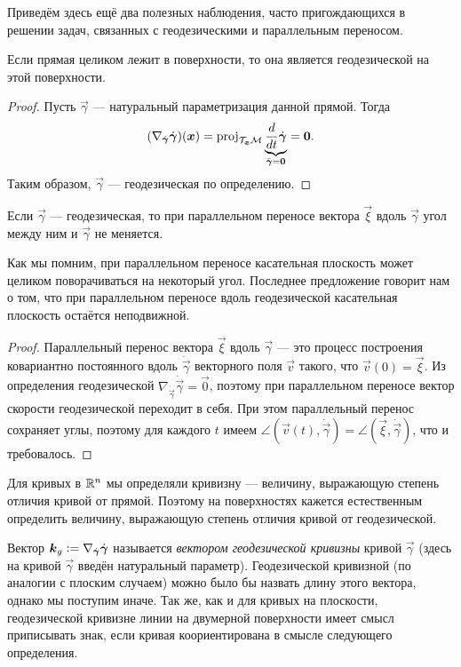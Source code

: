 Приведём здесь ещё два полезных наблюдения, часто пригождающихся в решении задач, связанных с геодезическими и параллельным переносом.

\begin{proposition}
	Если прямая целиком лежит в поверхности, то она является геодезической на этой поверхности.
\end{proposition}

\begin{proof}
	Пусть $\vec{\gamma}$ --- натуральный параметризация данной прямой. Тогда
	\[
		(\nabla_{\dot{\vec{\gamma}}}\dot{\vec{\gamma}})(\vec{x}) = \proj_{\T_{\vec{x}}\M}\underbrace{\frac{d}{dt}\dot{\vec{\gamma}}}_{\ddot{\vec{\gamma}} = \vec{0}} = \vec{0}.
	\]
	Таким образом, $\vec{\gamma}$ --- геодезическая по определению.
\end{proof}

\begin{proposition}
	Если $\vec{\gamma}$ --- геодезическая, то при параллельном переносе вектора $\vec{\xi}$ вдоль $\vec{\gamma}$ угол между ним и $\vec{\gamma}$ не меняется.
\end{proposition}

Как мы помним, при параллельном переносе касательная плоскость может целиком поворачиваться на некоторый угол. Последнее предложение говорит нам о том, что при параллельном переносе вдоль геодезической касательная плоскость остаётся неподвижной.

\begin{proof}
	Параллельный перенос вектора $\vec{\xi}$ вдоль $\vec{\gamma}$ --- это процесс построения ковариантно постоянного вдоль $\dot{\vec{\gamma}}$ векторного поля $\vec{v}$ такого, что $\vec{v}(0) = \vec{\xi}$. Из определения геодезической $\nabla_{\dot{\vec{\gamma}}}\dot{\vec{\gamma}} = \vec{0}$, поэтому при параллельном переносе вектор скорости геодезической переходит в себя. При этом параллельный перенос сохраняет углы, поэтому для каждого $t$ имеем $\angle(\vec{v}(t), \dot{\vec{\gamma}}) = \angle(\vec{\xi}, \dot{\vec{\gamma}})$, что и требовалось.
\end{proof}

Для кривых в $\R^n$ мы определяли кривизну --- величину, выражающую степень отличия кривой от прямой. Поэтому на поверхностях кажется естественным определить величину, выражающую степень отличия кривой от геодезической.

Вектор $\vec{k}_g \vcentcolon = \nabla_{\dot{\vec{\gamma}}}\dot{\vec{\gamma}}$ называется \textit{вектором геодезической кривизны} кривой $\vec{\gamma}$ (здесь на кривой $\vec{\gamma}$ введён натуральный параметр). Геодезической кривизной (по аналогии с плоским случаем) можно было бы назвать длину этого вектора, однако мы поступим иначе. Так же, как и для кривых на плоскости, геодезической кривизне линии на двумерной поверхности имеет смысл приписывать знак, если кривая коориентирована в смысле следующего определения.

